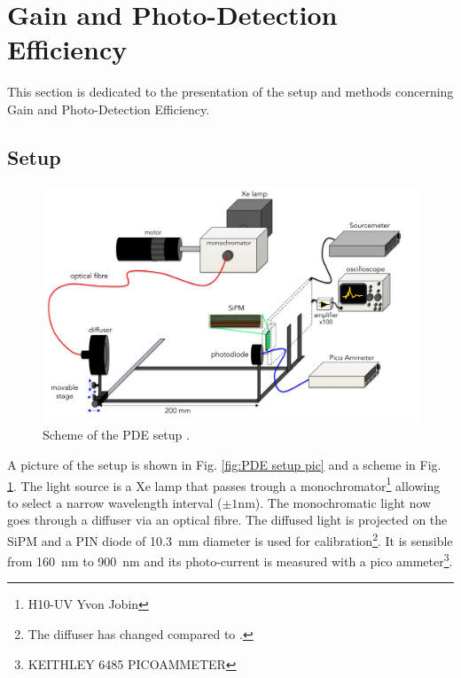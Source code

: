 \section{Gain and Photo-Detection Efficiency}
\label{section:Gain and Photo-Detection Efficiency}
This section is dedicated to the presentation of the setup and methods concerning Gain and Photo-Detection Efficiency.
\subsection{Setup}
\label{ch:Experimental methods:Gain and PDE:setup}
\begin{figure}[hbtp]
    \centering
    \includegraphics[width=\textwidth]{gfx/schemes/PDEsetupsketch.png}
    \caption{Scheme of the PDE setup \cite{Girard2018CharacterisationDistributions}.}
    \label{fig:PDE setup sketch}
\end{figure} 

A picture of the setup is shown in Fig. \ref{fig:PDE setup pic} and a scheme in Fig. \ref{fig:PDE setup sketch}. The light source is a Xe lamp that passes trough a monochromator\footnote{H10-UV Yvon Jobin} allowing to select a narrow wavelength interval ($\pm 1$nm). The monochromatic light now goes through a diffuser via an optical fibre. The diffused light is projected on the SiPM and a PIN diode of \SI{10.3}{mm} diameter is used for calibration\footnote{The diffuser has changed compared to \cite{Girard2018CharacterisationDistributions}.}. It is sensible from \SI{160}{\nano m} to \SI{900}{\nano m} and its photo-current is measured with a pico ammeter\footnote{KEITHLEY 6485 PICOAMMETER}. 


